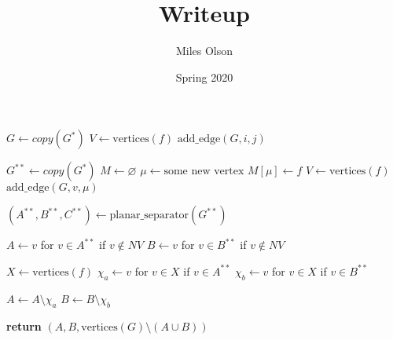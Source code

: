 \documentclass{article}
\title{Writeup}
\author{Miles Olson}
\date{Spring 2020}
\begin{document}
\maketitle

\begin{algorithmic}[1]
        \State $G \gets copy(G^*)$   
            \State $V \gets \text{vertices}(f)$
                \State $\text{add\_edge}(G, i, j)$
            \EndFor
        \EndFor

        \State $G^{**} \gets copy(G^*)$ 
        \State $M \gets \varnothing$
            \State $\mu \gets \text{some new vertex}$
            \State $M[\mu] \gets f$
            \State $V \gets \text{vertices}(f)$
                $\text{add\_edge}(G, v, \mu)$
            \EndFor
        \EndFor

        \State $(A^{**}, B^{**}, C^{**}) \gets \text{planar\_separator}(G^{**})$
        
        \State $A \gets v$ for  $v \in A^{**}$ if $v \notin NV$ 
        \State $B \gets v$ for  $v \in B^{**}$ if $v \notin NV$

                \State $X \gets \text{vertices}(f)$
                \State $\chi_a \gets v$ for $v \in X$ if $v \in A^{**}$
                \State $\chi_b \gets v$ for $v \in X$ if $v \in B^{**}$

                    \State $A \gets A \setminus \chi_a$
                \Else
                    \State $B \gets B \setminus \chi_b$
                \EndIf
            \EndIf
        \EndFor

        \State \textbf{return} $(A, B, \text{vertices}(G) \setminus (A \cup B))$
    \EndProcedure
\end{algorithmic}
\end{document}
